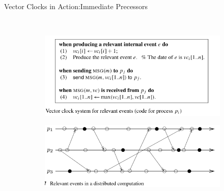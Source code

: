 \begin{frame}[fragile]{Vector Clocks in Action:}{Immediate Precessors}
    \justifying
    \begin{figure}
        \centering
        ~ %
        \begin{subfigure}[b]{0.5\textwidth}
            \includegraphics[scale=0.6]{Imagenes/eventosRelevantes02.png}
            \label{fig:ejemplo2}
        \end{subfigure}
        \begin{subfigure}[b]{0.5\textwidth}
            \includegraphics[scale=0.6]{Imagenes/eventosRelevantes01.png}
            \label{fig:ejemplo1}
        \end{subfigure}
        ~ %
    \end{figure}
\end{frame}